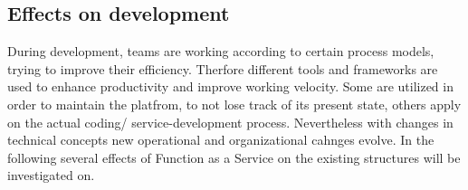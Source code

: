 \documentclass[a4paper,twoside,11pt, pagesize]{scrartcl}
\begin{document}
\subsection{Effects on development}
During development, teams are working according to certain process models, trying to improve their efficiency. Therfore different tools and frameworks are used to enhance productivity and improve working velocity. Some are utilized in order to maintain the platfrom, to not lose track of its present state, others apply on the actual coding/ service-development process. Nevertheless with changes in technical concepts new operational and organizational cahnges evolve. In the following several effects of Function as a Service on the existing structures will be investigated on. %
\end{document}
